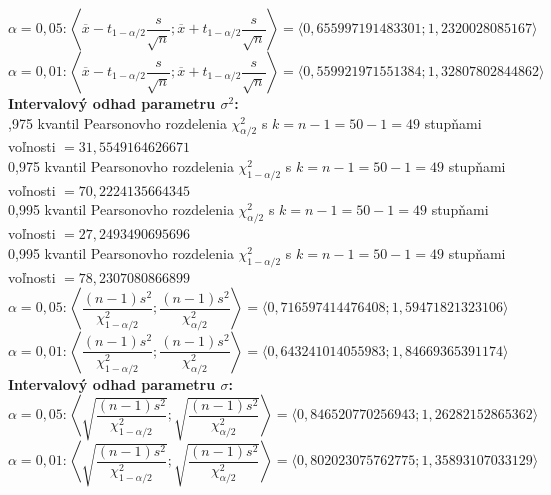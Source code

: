 \documentclass[pdftex, 11pt, a4paper, titlepage]{article}
\begin{document}
    \noindent
    $\alpha=0,05:\left\langle \overline{x}-t_{1-\alpha/2}\dfrac{s}{\sqrt{n}} ; \overline{x}+t_{1-\alpha/2}\dfrac{s}{\sqrt{n}} \right\rangle = \langle 0,655997191483301 ; 1,2320028085167 \rangle$\\
    $\alpha=0,01:\left\langle \overline{x}-t_{1-\alpha/2}\dfrac{s}{\sqrt{n}} ; \overline{x}+t_{1-\alpha/2}\dfrac{s}{\sqrt{n}} \right\rangle = \langle 0,559921971551384 ; 1,32807802844862 \rangle$\\


    \noindent
    \textbf{Intervalový odhad parametru $\sigma^2$:}\\
    ,975 kvantil Pearsonovho rozdelenia $\chi_{\alpha/2}^{2}$ s $k = n-1 = 50-1=49$
    stupňami voľnosti $=31,5549164626671$\\
    0,975 kvantil Pearsonovho rozdelenia $\chi_{1-\alpha/2}^{2}$ s $k = n-1 = 50-1=49$
    stupňami voľnosti $=70,2224135664345$\\
    0,995 kvantil Pearsonovho rozdelenia $\chi_{\alpha/2}^{2}$ s $k = n-1 = 50-1=49$
    stupňami voľnosti $=27,2493490695696$\\
    0,995 kvantil Pearsonovho rozdelenia $\chi_{1-\alpha/2}^{2}$ s $k = n-1 = 50-1=49$
    stupňami voľnosti $=78,2307080866899$\\

    \noindent
    $\alpha=0,05: \left\langle \dfrac{(n-1)s^2}{\chi_{1-\alpha/2}^2} ; \dfrac{(n-1)s^2}{\chi_{\alpha/2}^2} \right\rangle = \langle 0,716597414476408 ; 1,59471821323106 \rangle$\\
    $\alpha=0,01: \left\langle \dfrac{(n-1)s^2}{\chi_{1-\alpha/2}^2} ; \dfrac{(n-1)s^2}{\chi_{\alpha/2}^2} \right\rangle = \langle 0,643241014055983 ; 1,84669365391174 \rangle$\\

    \noindent
    \textbf{Intervalový odhad parametru $\sigma$:}\\

    \noindent
    $\alpha=0,05: \left\langle \sqrt{\dfrac{(n-1)s^2}{\chi_{1-\alpha/2}^2}} ; \sqrt{\dfrac{(n-1)s^2}{\chi_{\alpha/2}^2}} \right\rangle = \langle 0,846520770256943 ; 1,26282152865362 \rangle$\\
    $\alpha=0,01: \left\langle \sqrt{\dfrac{(n-1)s^2}{\chi_{1-\alpha/2}^2}} ; \sqrt{\dfrac{(n-1)s^2}{\chi_{\alpha/2}^2}} \right\rangle = \langle 0,802023075762775 ; 1,35893107033129 \rangle$\\
\end{document}
